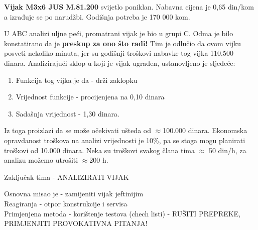 \documentclass[a4paper,12pt]{article}
\numberwithin{figure}{section}
\begin{document}
\textbf{Vijak M3x6 JUS M.81.200} svijetlo poniklan. Nabavna cijena je 0,65 din/kom a izrađuje se po narudžbi. Godišnja potreba je 170 000 kom.
\begin{figure}
  \vspace{-20pt}
  \begin{center}
    
  \end{center}
  \vspace{-20pt}
  \vspace{-10pt}
\end{figure}
U ABC analizi uljne peći, promatrani vijak je bio u grupi C. Odma je bilo konstatirano da je \textbf{preskup za ono što radi!} Tim je odlučio da ovom vijku posveti nekoliko minuta, jer su godišnji troškovi nabavke tog vijka 110.500 dinara. Analizirajući sklop u koji je vijak ugrađen, ustanovljeno je sljedeće:
\begin{enumerate}
\item Funkcija tog vijka je da - drži zaklopku
\item Vrijednost funkcije - procijenjena na 0,10 dinara
\item Sadašnja vrijednost - 1,30 dinara.
\end{enumerate} 
Iz toga proizlazi da se može očekivati ušteda od $\approx$100.000 dinara. Ekonomska opravdanost troškova na analizi vrijednosti je 10\%, pa se stoga mogu planirati troškovi od 10.000 dinara. Neka su troškovi svakog člana tima $\approx$ 50 din/h, za analizu možemo utrošiti $\approx$200 h.
\begin{center}
Zaključak tima - ANALIZIRATI VIJAK
\end{center}
Osnovna misao je - zamijeniti vijak jeftinijim\\
Reagiranja - otpor konstrukcije i servisa\\
Primjenjena metoda - korištenje testova (chech listi) - RUŠITI PREPREKE, PRIMJENJITI PROVOKATIVNA PITANJA!
\end{document}
